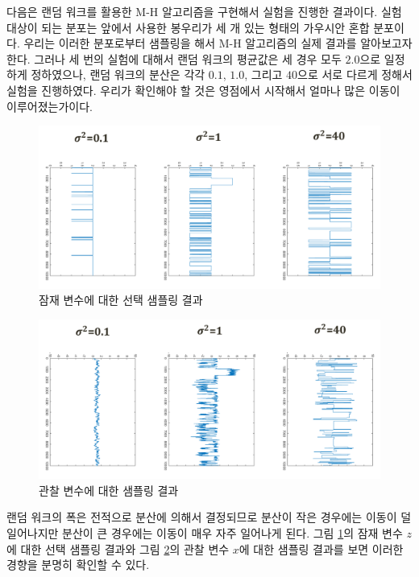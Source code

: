 \documentclass[a4paper]{oblivoir}
\begin{document}
다음은 랜덤 워크를 활용한 M-H 알고리즘을 구현해서 실험을 진행한 결과이다. 실험 대상이 되는 분포는 앞에서 사용한 봉우리가 세 개 있는 형태의 가우시안 혼합 분포이다. 우리는 이러한 분포로부터 샘플링을 해서 M-H 알고리즘의 실제 결과를 알아보고자 한다. 그러나 세 번의 실험에 대해서 랜덤 워크의 평균값은 세 경우 모두 $2.0$으로 일정하게 정하였으나, 랜덤 워크의 분산은 각각 $0.1$, $1.0$, 그리고 $40$으로 서로 다르게 정해서 실험을 진행하였다. 우리가 확인해야 할 것은 영점에서 시작해서 얼마나 많은 이동이 이루어졌는가이다. \\

\begin{figure}[ht] \centering 
\includegraphics[scale=0.6]{fig10_24.png} 
\caption{잠재 변수에 대한 선택 샘플링 결과}
\label{fig:10-11-3}
\end{figure}  

\begin{figure}[ht] \centering 
\includegraphics[scale=0.6]{fig10_25.png} 
\caption{관찰 변수에 대한 샘플링 결과}
\label{fig:10-11-4}
\end{figure}  

랜덤 워크의 폭은 전적으로 분산에 의해서 결정되므로 분산이 작은 경우에는 이동이 덜 일어나지만 분산이 큰 경우에는 이동이 매우 자주 일어나게 된다. 그림 \ref{fig:10-11-3}의 잠재 변수 $z$에 대한 선택 샘플링 결과와 그림 \ref{fig:10-11-4}의 관찰 변수 $x$에 대한 샘플링 결과를 보면 이러한 경향을 분명히 확인할 수 있다. 
\end{document}
